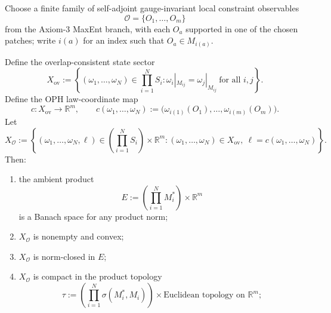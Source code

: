 Choose a finite family of self-adjoint gauge-invariant local constraint observables
\[
\mathcal O=\{O_1,\dots,O_m\}
\]
from the Axiom-3 MaxEnt branch, with each \(O_a\) supported in one of the chosen patches; write
\(i(a)\) for an index such that \(O_a\in M_{i(a)}\).

Define the overlap-consistent state sector
\[
X_{\mathrm{ov}}
:=
\left\{
(\omega_1,\dots,\omega_N)\in \prod_{i=1}^N S_i:
\omega_i|_{M_{ij}}=\omega_j|_{M_{ij}}\ \text{for all }i,j
\right\}.
\]
Define the OPH law-coordinate map
\[
c:X_{\mathrm{ov}}\to \mathbb R^m,
\qquad
c(\omega_1,\dots,\omega_N)
:=
\bigl(\omega_{i(1)}(O_1),\dots,\omega_{i(m)}(O_m)\bigr).
\]
Let
\[
X_{\mathcal O}
:=
\left\{
(\omega_1,\dots,\omega_N,\ell)\in
\left(\prod_{i=1}^N S_i\right)\times \mathbb R^m:
(\omega_1,\dots,\omega_N)\in X_{\mathrm{ov}},
\ \ell=c(\omega_1,\dots,\omega_N)
\right\}.
\]
Then:
\begin{enumerate}
\item the ambient product
\[
E:=
\left(\prod_{i=1}^N M_i^*\right)\times \mathbb R^m
\]
is a Banach space for any product norm;
\item \(X_{\mathcal O}\) is nonempty and convex;
\item \(X_{\mathcal O}\) is norm-closed in \(E\);
\item \(X_{\mathcal O}\) is compact in the product topology
\[
\tau
:=
\left(\prod_{i=1}^N \sigma(M_i^*,M_i)\right)\times
\text{Euclidean topology on }\mathbb R^m;
\]
\end{enumerate}

